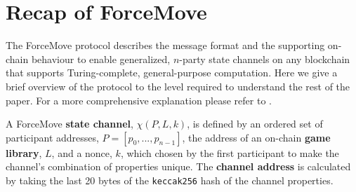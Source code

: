 
\usepackage{stmaryrd}
\usepackage{mathtools}
\usepackage{bm}
\theoremstyle{definition}
\newtheorem{exmp}{Example}[section]

\newcommand{\adj}[1]{\llbracket #1 \rrbracket} 
\newcommand{\enf}[1]{[#1]} 



\maketitle

\section{Recap of ForceMove}

The ForceMove protocol describes the message format and the supporting on-chain behaviour
to enable generalized, $n$-party state channels on any blockchain that supports Turing-complete, general-purpose
computation. Here we give a brief overview of the protocol to the level required to understand
the rest of the paper. For a more comprehensive explanation please refer to \cite{}.

A ForceMove \textbf{state channel}, $\chi(P, L, k)$, is defined by an ordered set of participant
addresses, $P = [p_0, ..., p_{n-1}]$, the address of an on-chain \textbf{game library}, $L$,
and a nonce, $k$, which chosen by the first participant to make the channel's combination of properties unique.
The \textbf{channel address} is calculated by taking the last 20 bytes of the \texttt{keccak256}
hash of the channel properties. 

